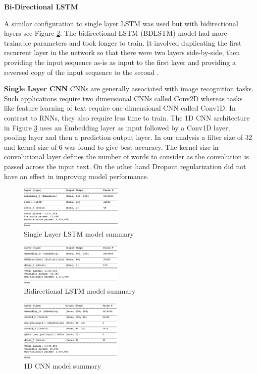 \documentclass[conference]{IEEEtran}
\begin{document}
\textbf{Bi-Directional LSTM}

A similar configuration to single layer LSTM was used but with bidirectional layers see Figure \ref{fig:fig12}. The bidirectional LSTM (BDLSTM) model had more trainable parameters and took longer to train. It involved duplicating the first recurrent layer in the network so that there were two layers side-by-side, then providing the input sequence as-is as input to the first layer and providing a reversed copy of the input sequence to the second \cite{zworld}.


\textbf{Single Layer CNN}
CNNs are generally associated with image recognition tasks. Such applications require two dimensional CNNs called Conv2D whereas tasks like feature learning of text require one dimensional CNN called Conv1D. In contrast to RNNs, they also require less time to train. The 1D CNN architecture in Figure \ref{fig:fig13} uses an Embedding layer as input followed by a Conv1D layer, pooling layer and then a prediction output layer. 
In our analysis a filter size of 32 and kernel size of 6 was found to give best accuracy. The kernel size in convolutional layer defines the number of words to consider as the convolution is passed across the input text. 
On the other hand Dropout regularization did not have an effect in improving model performance. 



\begin{figure}[h]
\centering
\includegraphics[width=0.45\textwidth]{singlelayerlstm.png}
\caption{Single Layer LSTM model summary}
\label{fig:fig14}
\end{figure} 

\begin{figure}[h]
\centering
\includegraphics[width=0.45\textwidth]{bi-directional lstm.png}
\caption{Bidirectional LSTM model summary}
\label{fig:fig12}
\end{figure}  


\begin{figure}[h]
\centering
\includegraphics[width=0.45\textwidth]{1dcnn.png}
\caption{1D CNN model summary}
\label{fig:fig13}
\end{figure} 
\end{document}
